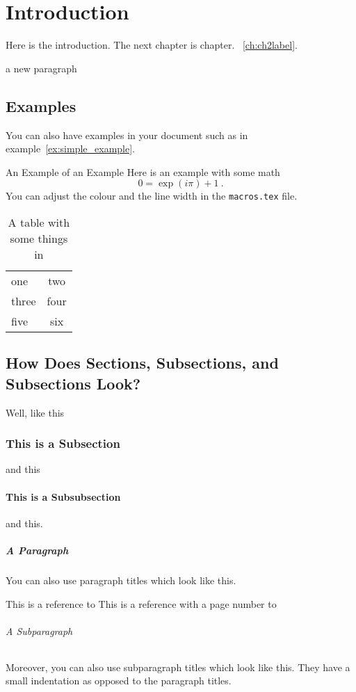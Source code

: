 \chapter{Introduction}\label{ch:introduction}
Here is the introduction. The next chapter is chapter. ~\ref{ch:ch2label}.


a new paragraph


\section{Examples}
You can also have examples in your document such as in example~\ref{ex:simple_example}.
\begin{example}{An Example of an Example}
  \label{ex:simple_example}
  Here is an example with some math
  \begin{equation}
    0 = \exp(i\pi)+1\ .
  \end{equation}
  You can adjust the colour and the line width in the {\tt macros.tex} file.
\end{example}

\begin{table}
    \noindent\begin{tabular}{|l|c|}
        \rowcolor{aaublue}
        {\color[HTML]{FFFFFF} one} & {\color[HTML]{FFFFFF} two} \\
        three & four \\
        five & six \\ \hline
        
    \end{tabular}
    \caption{A table with some things in}
    \label{tab:table}
\end{table}

\section{How Does Sections, Subsections, and Subsections Look?}
Well, like this
\subsection{This is a Subsection}
and this
\subsubsection{This is a Subsubsection}
and this.

\paragraph{A Paragraph}
You can also use paragraph titles which look like this.

This is a reference to 
\newline
This is a reference with a page number to 

\subparagraph{A Subparagraph} Moreover, you can also use subparagraph titles which look like this. They have a small indentation as opposed to the paragraph titles.

